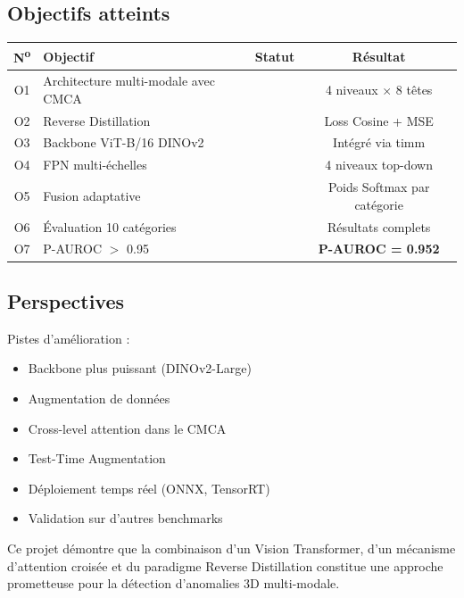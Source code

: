 \documentclass[12pt,a4paper,oneside]{report}
\newcommand{\cmark}{\textcolor{accentgreen}{\textbf{\checkmark}}}
\begin{document}
\subsection*{Objectifs atteints}

\begin{table}[H]
\centering
\begin{tabularx}{\textwidth}{c X c c}
\toprule
\textbf{N\textsuperscript{o}} & \textbf{Objectif} & \textbf{Statut} & \textbf{Résultat} \\
\midrule
\rowcolor{tableheader} O1 & Architecture multi-modale avec CMCA & \cmark & 4 niveaux $\times$ 8 têtes \\
O2 & Reverse Distillation & \cmark & Loss Cosine + MSE \\
\rowcolor{tableheader} O3 & Backbone ViT-B/16 DINOv2 & \cmark & Intégré via timm \\
O4 & FPN multi-échelles & \cmark & 4 niveaux top-down \\
\rowcolor{tableheader} O5 & Fusion adaptative & \cmark & Poids Softmax par catégorie \\
O6 & Évaluation 10 catégories & \cmark & Résultats complets \\
\rowcolor{tableheader} O7 & P-AUROC $>$ 0.95 & \cmark & \textbf{P-AUROC = 0.952} \\
\bottomrule
\end{tabularx}
\end{table}

\subsection*{Perspectives}

Pistes d'amélioration :
\begin{itemize}
    \item Backbone plus puissant (DINOv2-Large)
    \item Augmentation de données
    \item Cross-level attention dans le CMCA
    \item Test-Time Augmentation
    \item Déploiement temps réel (ONNX, TensorRT)
    \item Validation sur d'autres benchmarks
\end{itemize}

Ce projet démontre que la combinaison d'un Vision Transformer, d'un mécanisme d'attention croisée et du paradigme Reverse Distillation constitue une approche prometteuse pour la détection d'anomalies 3D multi-modale.
\end{document}
